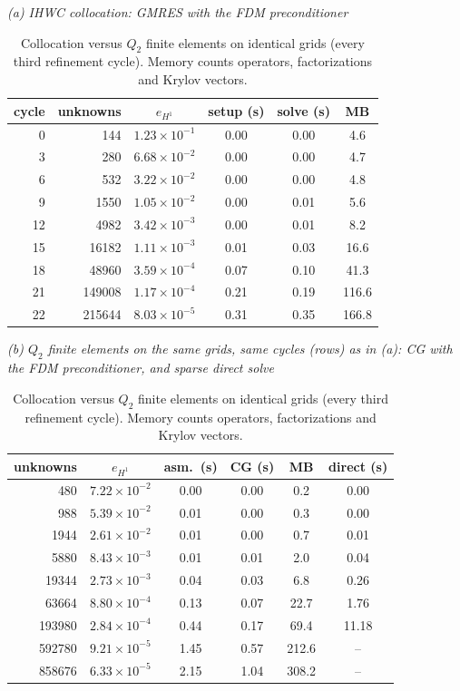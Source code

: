 \documentclass[smallextended,envcountsame]{svjour3}
\begin{document}
\begin{table}[t]\centering\footnotesize
\caption{Collocation versus $Q_2$ finite elements on identical grids (every third refinement cycle).
Memory counts operators, factorizations and Krylov vectors.}\label{tab:q2}
\textit{(a) IHWC collocation: GMRES with the FDM preconditioner}\\[2pt]
\begin{tabular}{rr c ccc}
\toprule
cycle & unknowns & $e_{H^1}$ & setup (s) & solve (s) & MB\\
\midrule
0 & 144 & $1.23{\times}10^{-1}$ & 0.00 & 0.00 & 4.6\\
3 & 280 & $6.68{\times}10^{-2}$ & 0.00 & 0.00 & 4.7\\
6 & 532 & $3.22{\times}10^{-2}$ & 0.00 & 0.00 & 4.8\\
9 & 1550 & $1.05{\times}10^{-2}$ & 0.00 & 0.01 & 5.6\\
12 & 4982 & $3.42{\times}10^{-3}$ & 0.00 & 0.01 & 8.2\\
15 & 16182 & $1.11{\times}10^{-3}$ & 0.01 & 0.03 & 16.6\\
18 & 48960 & $3.59{\times}10^{-4}$ & 0.07 & 0.10 & 41.3\\
21 & 149008 & $1.17{\times}10^{-4}$ & 0.21 & 0.19 & 116.6\\
22 & 215644 & $8.03{\times}10^{-5}$ & 0.31 & 0.35 & 166.8\\
\bottomrule
\end{tabular}

\medskip
\textit{(b) $Q_2$ finite elements on the same grids, same cycles (rows) as in (a): CG with the FDM preconditioner, and sparse direct solve}\\[2pt]
\begin{tabular}{r c cccc}
\toprule
unknowns & $e_{H^1}$ & asm.\ (s) & CG (s) & MB & direct (s)\\
\midrule
480 & $7.22{\times}10^{-2}$ & 0.00 & 0.00 & 0.2 & 0.00\\
988 & $5.39{\times}10^{-2}$ & 0.01 & 0.00 & 0.3 & 0.00\\
1944 & $2.61{\times}10^{-2}$ & 0.01 & 0.00 & 0.7 & 0.01\\
5880 & $8.43{\times}10^{-3}$ & 0.01 & 0.01 & 2.0 & 0.04\\
19344 & $2.73{\times}10^{-3}$ & 0.04 & 0.03 & 6.8 & 0.26\\
63664 & $8.80{\times}10^{-4}$ & 0.13 & 0.07 & 22.7 & 1.76\\
193980 & $2.84{\times}10^{-4}$ & 0.44 & 0.17 & 69.4 & 11.18\\
592780 & $9.21{\times}10^{-5}$ & 1.45 & 0.57 & 212.6 & --\\
858676 & $6.33{\times}10^{-5}$ & 2.15 & 1.04 & 308.2 & --\\
\bottomrule
\end{tabular}
\end{table}
\end{document}
